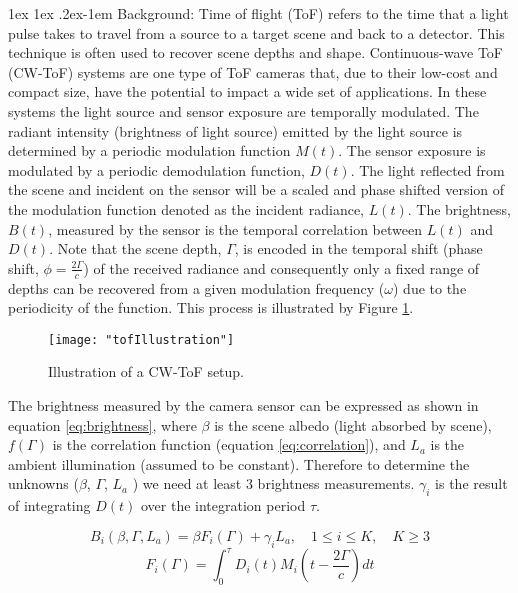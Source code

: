 \documentclass[11pt]{article}
\makeatletter
\renewcommand{\paragraph}{%
  \@startsection{paragraph}{4}%
  {\z@}{1ex \@plus 1ex \@minus .2ex}{-1em}%
  {\normalfont\normalsize\bfseries}%
}
\makeatother
\begin{document}
\maketitle

\paragraph{Background:} Time of flight (ToF) refers to the time that a light pulse takes to travel from a source to a target scene and back to a detector. This technique is often used to recover scene depths and shape. Continuous-wave ToF (CW-ToF) systems are one type of ToF cameras that, due to their low-cost and compact size, have the potential to impact a wide set of applications. In these systems the light source and sensor exposure are temporally modulated. The radiant intensity (brightness of light source) emitted by the light source is determined by a periodic modulation function $M(t)$. The sensor exposure is modulated by a periodic demodulation function, $D(t)$. The light reflected from the scene and incident on the sensor will be a scaled and phase shifted version of the modulation function denoted as the incident radiance, $L(t)$. The brightness, $B(t)$, measured by the sensor is the temporal correlation between $L(t)$ and $D(t)$. Note that the scene depth, $\Gamma$, is encoded in the temporal shift (phase shift, $\phi = \frac{2\Gamma}{c}$) of the received radiance and consequently only a fixed range of depths can be recovered from a given modulation frequency ($\omega$) due to the periodicity of the function. This process is illustrated by Figure \ref{fig:tofIllustration}.

\begin{figure}[h]
\centerline{%
\texttt{[image: "tofIllustration"]}%
}
\caption{Illustration of a CW-ToF setup.}
\label{fig:tofIllustration}
\end{figure}

The brightness measured by the camera sensor can be expressed as shown in equation \ref{eq:brightness}, where $\beta$ is the scene albedo (light absorbed by scene), $f(\Gamma)$ is the correlation function (equation \ref{eq:correlation}), and $L_a$ is the ambient illumination (assumed to be constant). Therefore to determine the unknowns ($\beta$, $\Gamma$, $L_a$ ) we need at least 3 brightness measurements. $\gamma_{i}$ is the result of integrating $D(t)$ over the integration period $\tau$.


\begin{equation} \label{eq:brightness}
    B_{i}(\beta,\Gamma,L_a) = \beta F_{i}(\Gamma) + \gamma_{i}L_{a}, \quad 1 \leq i \leq K, \quad K \geq 3
\end{equation}
\begin{equation} \label{eq:correlation}
    F_{i}(\Gamma) = \int_{0}^{\tau} D_{i}(t)M_{i}(t - \frac{2\Gamma}{c}) dt
\end{equation}
\end{document}
